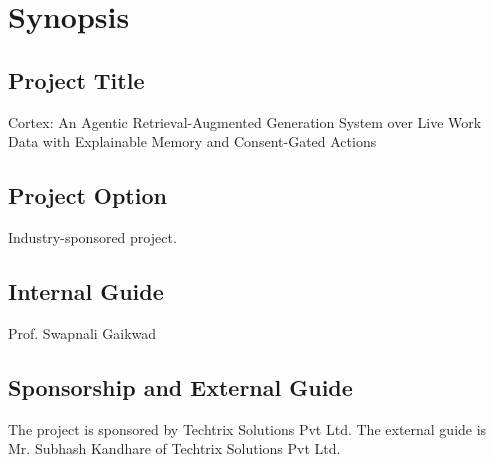 \documentclass[oneside,a4paper,12pt]{report}
\newcommand{\ProjectTitle}{Cortex: An Agentic Retrieval-Augmented Generation System over Live Work Data with Explainable Memory and Consent-Gated Actions}
\begin{document}
\setlength{\parindent}{11mm}
\chapter{Synopsis}

\section{Project Title}
 \ProjectTitle

\section{ Project Option }
Industry-sponsored project.

\section{Internal Guide}
Prof. Swapnali Gaikwad

\section{ Sponsorship and External Guide}
The project is sponsored by Techtrix Solutions Pvt Ltd. The external guide is Mr. Subhash Kandhare of Techtrix Solutions Pvt Ltd.
\end{document}

